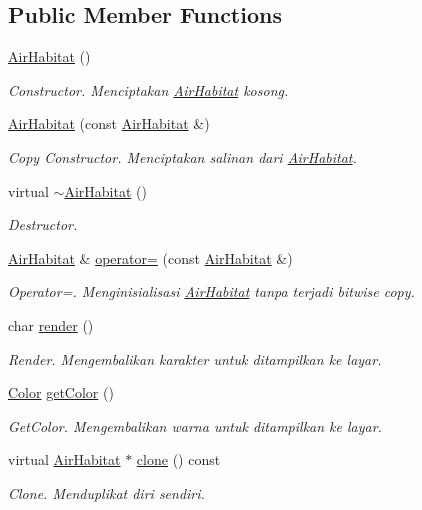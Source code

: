 \subsection*{Public Member Functions}
\begin{DoxyCompactItemize}
\item 
\hyperlink{classAirHabitat_aaf82e1201cb35917975fa58ac5a67763}{Air\+Habitat} ()
\begin{DoxyCompactList}\small\item\em Constructor. Menciptakan \hyperlink{classAirHabitat}{Air\+Habitat} kosong. \end{DoxyCompactList}\item 
\hyperlink{classAirHabitat_aaec41ff6acf673890740254b9b47c139}{Air\+Habitat} (const \hyperlink{classAirHabitat}{Air\+Habitat} \&)
\begin{DoxyCompactList}\small\item\em Copy Constructor. Menciptakan salinan dari \hyperlink{classAirHabitat}{Air\+Habitat}. \end{DoxyCompactList}\item 
virtual \hyperlink{classAirHabitat_a18f98f33d3edbb7c397e184f3b7ad56b}{$\sim$\+Air\+Habitat} ()
\begin{DoxyCompactList}\small\item\em Destructor. \end{DoxyCompactList}\item 
\hyperlink{classAirHabitat}{Air\+Habitat} \& \hyperlink{classAirHabitat_a250ef96c8fc2dc62762fcb09819d2098}{operator=} (const \hyperlink{classAirHabitat}{Air\+Habitat} \&)
\begin{DoxyCompactList}\small\item\em Operator=. Menginisialisasi \hyperlink{classAirHabitat}{Air\+Habitat} tanpa terjadi bitwise copy. \end{DoxyCompactList}\item 
char \hyperlink{classAirHabitat_a669080a10d4604141457ba113e5a47e1}{render} ()
\begin{DoxyCompactList}\small\item\em Render. Mengembalikan karakter untuk ditampilkan ke layar. \end{DoxyCompactList}\item 
\hyperlink{color_8h_ab87bacfdad76e61b9412d7124be44c1c}{Color} \hyperlink{classAirHabitat_a098728ad7523cf75ea59f71271a2ace9}{get\+Color} ()
\begin{DoxyCompactList}\small\item\em Get\+Color. Mengembalikan warna untuk ditampilkan ke layar. \end{DoxyCompactList}\item 
virtual \hyperlink{classAirHabitat}{Air\+Habitat} $\ast$ \hyperlink{classAirHabitat_ab756521fcd5adca0283e9bfd0d0fd075}{clone} () const 
\begin{DoxyCompactList}\small\item\em Clone. Menduplikat diri sendiri. \end{DoxyCompactList}\end{DoxyCompactItemize}

